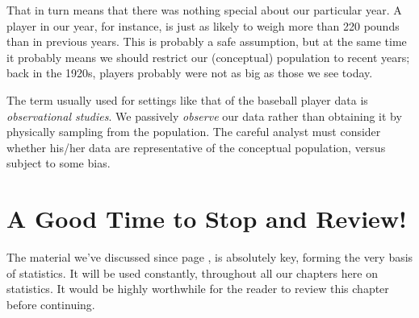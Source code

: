 That in turn means that there was nothing special about our particular
year.  A player in our year, for instance, is just as likely to weigh
more than 220 pounds than in previous years.  This is probably a safe
assumption, but at the same time it probably means we should restrict
our (conceptual) population to recent years; back in the 1920s, players
probably were not as big as those we see today.

The term usually used for settings like that of the baseball player data
is {\it observational studies}.  We passively {\it observe} our data
rather than obtaining it by physically sampling from the population.
The careful analyst must consider whether his/her data are
representative of the conceptual population, versus subject to some
bias.

\section{A Good Time to Stop and Review!} 
 
The material we've discussed since page \pageref{startcrucial}, is
absolutely key, forming the very basis of statistics.  It will be used
constantly, throughout all our chapters here on statistics.  It would be
highly worthwhile for the reader to review this chapter before
continuing.
 
